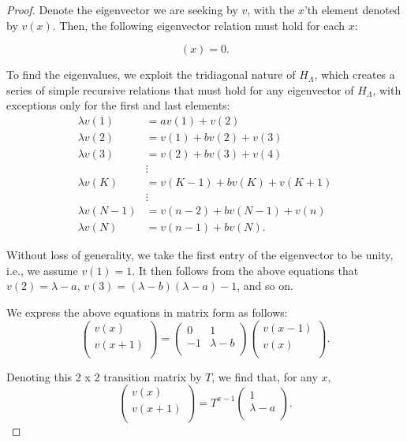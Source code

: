 \documentclass{article}
\newcommand{\hl}{H_\Lambda}
\numberwithin{equation}{section}
\numberwithin{theorem}{section}
\numberwithin{proposition}{section}
\numberwithin{lemma}{section}
\numberwithin{corollary}{section}
\numberwithin{definition}{section}
\begin{document}
\begin{proof}


Denote the eigenvector we are seeking by $v$, with the $x$'th element denoted by $v(x)$. Then, the following eigenvector relation must hold for each $x$:

\begin{equation}
[(\hl - \lambda \mathbb{I})v](x) = 0.
\end{equation}


To find the eigenvalues, we exploit the tridiagonal nature of $\hl$, which creates a series of simple recursive relations that must hold for any eigenvector of $\hl$, with exceptions only for the first and last elements:
\begin{align*}
	\lambda v(1) &= av(1) + v(2)
	\\ \lambda v(2) &= v(1) + bv(2) + v(3)
	\\ \lambda v(3) &= v(2) + bv(3) + v(4)
	\\ &\vdots
	\\ \lambda v(K) &= v(K-1) + bv(K) + v(K+1)
	\\ &\vdots
	\\ \lambda v(N-1) &= v(n-2) + bv(N-1) + v(n)
	\\ \lambda v(N) &= v(n-1) + bv(N).
\end{align*}

Without loss of generality, we take the first entry of the eigenvector to be unity, i.e., we assume $v(1) = 1$. It then follows from the above equations that $v(2) = \lambda - a$, $v(3) = (\lambda-b)(\lambda-a) - 1$, and so on.

We express the above equations in matrix form as follows:
\begin{equation*}
	\left(
	\begin{array}{c}
		v(x) \\
		v(x+1) \\
	\end{array}
	\right)
	=
	\left(
	\begin{array}{cc}
		0 & 1 \\
		-1 & \lambda - b \\
	\end{array}
	\right)
	\left(
	\begin{array}{c}
		v(x-1) \\
		v(x) \\
	\end{array}
	\right).
\end{equation*}

Denoting this 2 x 2 transition matrix by $T$, we find that, for any $x$,
\begin{equation}
	\left(
	\begin{array}{c}
		v(x) \\
		v(x+1) \\
	\end{array}
	\right)
	=
	T^{x-1}
	\left(
	\begin{array}{c}
		1 \\
		\lambda - a \\
	\end{array}
	\right).
\end{equation}


\end{proof}
\end{document}
